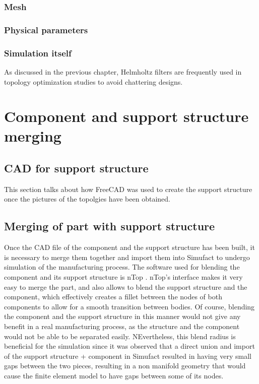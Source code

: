 \documentclass[../main.tex]{subfiles}
\begin{document}
\subsubsection{Mesh}

\subsubsection{Physical parameters}

\subsubsection{Simulation itself}


As discussed in the previous chapter, Helmholtz filters are frequently used in topology optimization studies to avoid chattering designs. 


\section{Component and support structure merging}

\subsection{CAD for support structure}

This section talks about how FreeCAD was used to create the support structure once the pictures of the topolgies have been obtained.

\subsection{Merging of part with support structure}

Once the CAD file of the component and the support structure has been built, it is necessary to merge them together and import them into Simufact to undergo simulation of the manufacturing process. The software used for blending the component and its support structure is nTop . nTop's interface makes it very easy to merge the part, and also allows to blend the support structure and the component, which effectively creates a fillet between the nodes of both components to allow for a smooth transition between bodies. Of course, blending the component and the support structure in this manner would not give any benefit in a real manufacturing process, as the structure and the component would not be able to be separated easily. NEvertheless, this blend radius is beneficial for the simulation since it was observed that a direct union and import of the support structure + component in Simufact resulted in having very small gaps between the two pieces, resulting in a non manifold geometry that would cause the finite element model to have gaps between some of its nodes. 
\end{document}
